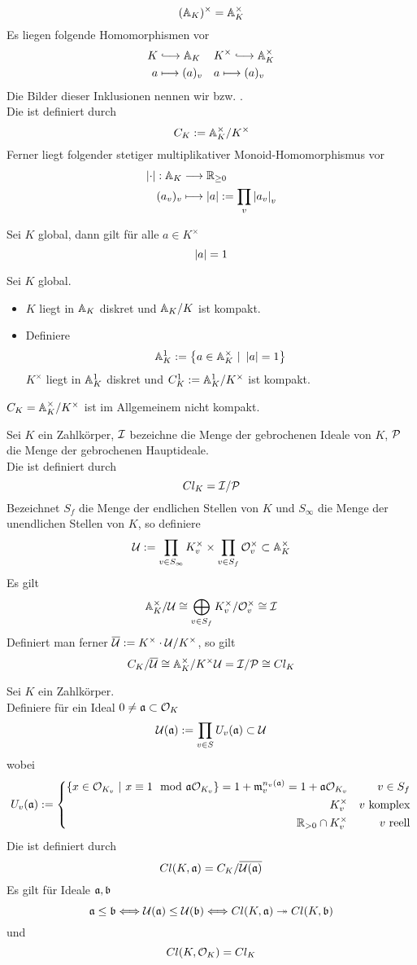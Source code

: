 \Bem{}
\[(\A_K)^\times = \A_K^\times \]
Es liegen folgende Homomorphismen vor
\begin{align*}
K & \Inj{} \A_K && K^\times \Inj{} \A_K^\times\\
a & \longmapsto (a)_v && a\longmapsto (a)_v
\end{align*}
Die Bilder dieser Inklusionen nennen wir  bzw. .\\
Die  ist definiert durch
\[ C_K := \A_K^\times / K^\times \]
Ferner liegt folgender stetiger multiplikativer Monoid-Homomorphismus vor
\begin{align*}
\bet{\cdot} : \A_K &\Pfeil{} \R_{\geq 0}\\
(a_v)_v & \longmapsto \bet{a} := \prod_{v}\bet{a_v}_v
\end{align*}

Sei $K$ global, dann gilt für alle $a \in K^\times$
\[ \bet{a} = 1 \]

\Satz{}
Sei $K$ global.
\begin{itemize}
\item $K$ liegt in $\A_K$ diskret und $\A_K/K$ ist kompakt.
\item Definiere
\[ \A_K^1 := \set{a\in\A_K^\times}{ \bet{a} = 1 } \]
$K^\times$ liegt in $\A_K^1$ diskret und $C^1_K:= \A_K^1/K^\times$ ist kompakt.
\end{itemize}

\Bem{}
$C_K = \A_K^\times/K^\times$ ist im Allgemeinem nicht kompakt.

Sei $K$ ein Zahlkörper, $\I$ bezeichne die Menge der gebrochenen Ideale von $K$, $\P$ die Menge der gebrochenen Hauptideale.\\
Die  ist definiert durch
\[Cl_K = \I/\P \]
Bezeichnet $S_f$ die Menge der endlichen Stellen von $K$ und $S_\infty$ die Menge der unendlichen Stellen von $K$, so definiere
\[ \U := \prod_{v\in S_\infty}K_v^\times \times \prod_{v\in S_f} \O_v^\times \subset \A_K^\times \]
Es gilt
\[ \A_K^\times / \U \isom{} \bigoplus_{v\in S_f} K_v^\times / \O_v^\times \isom{} \I  \]
Definiert man ferner $\overline{\U} := K^\times\cdot\U/K^\times$, so gilt
\[ C_K / \overline{\U} \isom{} \A_K^\times / K^\times \U = \I / \P \isom{} Cl_K \]

Sei $K$ ein Zahlkörper.\\
Definiere für ein Ideal $0\neq \af \subset \O_K$
\[ \U(\af) := \prod_{v\in S}U_v(\af) \subset \U \]
wobei
\[ U_v(\af) := \left\lbrace
\begin{aligned}
\{x \in \O_{K_v}~|~x \equiv 1 \mod{\af\O_{K_v}}\} = 1 + \mf_v^{n_v(\af)} = 1 + \af \O_{K_v} && v \in S_f\\
K_v^\times && v \text{ komplex}\\
\R_{>0} \cap K^\times_v && v \text{ reell}
\end{aligned}
\right. \]
Die  ist definiert durch
\[Cl(K, \af) = C_K / \overline{\U(\af)} \]
Es gilt für Ideale $\af,\bf$
\[ \af \leq \bf \Gdw{} \U(\af) \leq \U(\bf) \Gdw{} Cl(K,\af) \surj{} Cl(K,\bf) \]
und
\[ Cl(K,\O_K) = Cl_K \]


